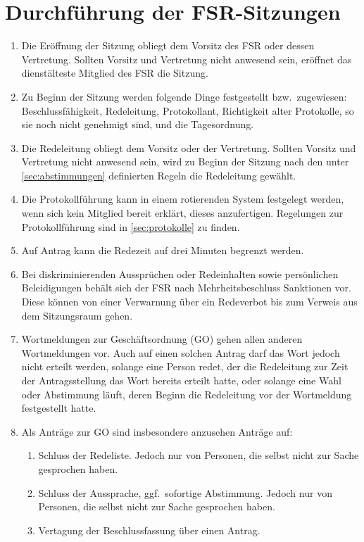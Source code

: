 \section{Durchführung der FSR-Sitzungen}
\label{sec:Sitzungen}
\begin{enumerate}
	\item Die Eröffnung der Sitzung obliegt dem Vorsitz des FSR oder dessen Vertretung.
	Sollten Vorsitz und Vertretung nicht anwesend sein, eröffnet das dienstälteste Mitglied des FSR die Sitzung.
	\item Zu Beginn der Sitzung werden folgende Dinge festgestellt bzw.\ zugewiesen: Beschlussfähigkeit, Redeleitung, Protokollant, Richtigkeit alter Protokolle, so sie noch nicht genehmigt sind, und die Tagesordnung.
	\item Die Redeleitung obliegt dem Vorsitz oder der Vertretung.
	Sollten Vorsitz und Vertretung nicht anwesend sein, wird zu Beginn der Sitzung nach den unter \ref{sec:abstimmungen} definierten Regeln die Redeleitung gewählt.
	\item Die Protokollführung kann in einem rotierenden System festgelegt werden, wenn sich kein Mitglied bereit erklärt, dieses anzufertigen.
	Regelungen zur Protokollführung sind in \ref{sec:protokolle} zu finden.
	\item Auf Antrag kann die Redezeit auf drei Minuten begrenzt werden.
	\item Bei diskriminierenden Aussprüchen oder Redeinhalten sowie persönlichen Beleidigungen behält sich der FSR nach Mehrheitsbeschluss Sanktionen vor.
	Diese können von einer Verwarnung über ein Redeverbot bis zum Verweis aus dem Sitzungsraum gehen.
	\item Wortmeldungen zur Geschäftsordnung (GO) gehen allen anderen Wortmeldungen vor.
	Auch auf einen solchen Antrag darf das Wort jedoch nicht erteilt werden, solange eine Person redet, der die Redeleitung zur Zeit der Antragsstellung das Wort bereits erteilt hatte, oder solange eine Wahl oder Abstimmung läuft, deren Beginn die Redeleitung vor der Wortmeldung festgestellt hatte.
	\item Als Anträge zur GO sind insbesondere anzusehen Anträge auf:
	\begin{enumerate}
		\item Schluss der Redeliste.
		Jedoch nur von Personen, die selbst nicht zur Sache gesprochen haben.
		\item Schluss der Aussprache, ggf.\ sofortige Abstimmung.
		Jedoch nur von Personen, die selbst nicht zur Sache gesprochen haben.
		\item Vertagung der Beschlussfassung über einen Antrag.

\end{enumerate}
\end{enumerate}
